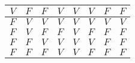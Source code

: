 {\begin{frame}[t]
\begin{table}[]
\begin{tabular}{cccc|c|c|c|c}
        \multicolumn{1}{|c|}{$V$}                                & \multicolumn{1}{c|}{$F$}                                & \multicolumn{1}{c|}{$F$}                                & $V$                   & $V$                                & $V$                         & $F$                                             & \multicolumn{1}{c|}{$F$}                                 \\ \hline
        \multicolumn{1}{|c|}{$F$}                                & \multicolumn{1}{c|}{$V$}                                & \multicolumn{1}{c|}{$V$}                                & $V$                   & $V$                                & $V$                         & $V$                                             & \multicolumn{1}{c|}{$V$}                                 \\ \hline
        \multicolumn{1}{|c|}{$F$}                                & \multicolumn{1}{c|}{$V$}                                & \multicolumn{1}{c|}{$F$}                                & $F$                   & $V$                                & $F$                         & $F$                                             & \multicolumn{1}{c|}{$F$}                                 \\ \hline
        \multicolumn{1}{|c|}{$F$}                                & \multicolumn{1}{c|}{$F$}                                & \multicolumn{1}{c|}{$V$}                                & $V$                   & $V$                                & $V$                         & $F$                                             & \multicolumn{1}{c|}{$F$}                                 \\ \hline
        \multicolumn{1}{|c|}{$F$}                                & \multicolumn{1}{c|}{$F$}                                & \multicolumn{1}{c|}{$F$}                                & $V$                   & $V$                                & $F$                         & $F$                                             & \multicolumn{1}{c|}{$F$}                                 \\ \hline
        \end{tabular}
    \end{table}
\end{frame}
}
% 
